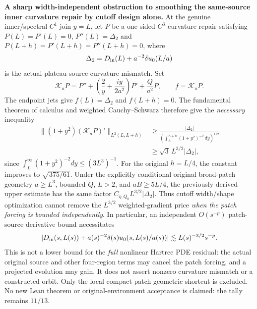 \documentclass[11pt]{amsart}
\begin{document}
\medskip
\noindent\textbf{A sharp width-independent obstruction to smoothing the
same-source inner curvature repair by cutoff design alone.}
At the genuine inner/spectral $C^1$ join $y=L$, let $P$ be a
one-sided $C^3$ curvature repair satisfying
$P(L)=P'(L)=0$, $P''(L)=\Delta_2$ and
$P(L+h)=P'(L+h)=P''(L+h)=0$, where
\[
 \Delta_2=D_{\rm in}(L)+a^{-2}\delta u_0(L/a)
\]
is the actual plateau-source curvature mismatch. Set
\[
 \mathcal K_aP=P''+
 \left(\frac2y+\frac{iy}{2a^2}\right)P'
 +\frac{Q}{a^2}P,\qquad f=\mathcal K_aP.
\]
The endpoint jets give $f(L)=\Delta_2$ and $f(L+h)=0$.
The fundamental theorem of calculus and weighted
Cauchy--Schwarz therefore give the \emph{necessary} inequality
\[
 \begin{aligned}
 \big\|(1+y^2)(\mathcal K_aP)'\big\|_{L^2(L,L+h)}
 &\ge
 \frac{|\Delta_2|}
 {\left(\int_L^{L+h}(1+y^2)^{-2}\,dy\right)^{1/2}}\\
 &\ge\sqrt3\,L^{3/2}|\Delta_2|,
 \end{aligned}
\]
since $\int_L^\infty(1+y^2)^{-2}dy\le(3L^3)^{-1}$.
For the original $h=L/4$, the constant improves to
$\sqrt{375/61}$.
Under the explicitly conditional original broad-patch geometry
$a\ge L^3$, bounded $Q$, $L>2$, and $aB\ge5L/4$,
the previously derived upper estimate has the same factor
$C_{\eta,Q_0}L^{3/2}|\Delta_2|$.
Thus cutoff width/shape optimization cannot remove the
$L^{3/2}$ weighted-gradient price \emph{when the patch forcing
is bounded independently}. In particular, an independent
$O(s^{-p})$ patch-source derivative bound necessitates
\[
 |D_{\rm in}(s,L(s))+a(s)^{-2}\delta(s)u_0(s,L(s)/a(s))|
 \lesssim L(s)^{-3/2}s^{-p}.
\]
This is not a lower bound for the \emph{full} nonlinear Hartree PDE
residual: the actual original source and other four-region terms
may cancel the patch forcing, and a projected evolution may gain.
It does not assert nonzero curvature mismatch or a constructed
orbit. Only the local compact-patch geometric shortcut is excluded.
No new Lean theorem or original-environment acceptance is claimed:
the tally remains $11/13$.
\end{document}
